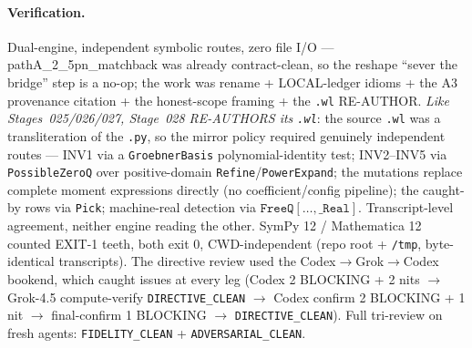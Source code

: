 \paragraph{Verification.}
Dual-engine, independent symbolic routes, zero file I/O --- pathA\_2\_5pn\_matchback was already contract-clean, so the
reshape ``sever the bridge'' step is a no-op; the work was rename + LOCAL-ledger idioms + the A3 provenance citation + the
honest-scope framing + the \texttt{.wl} RE-AUTHOR. \emph{Like Stages~025/026/027, Stage~028 RE-AUTHORS its \texttt{.wl}}: the
source \texttt{.wl} was a transliteration of the \texttt{.py}, so the mirror policy required genuinely independent routes ---
INV1 via a \texttt{GroebnerBasis} polynomial-identity test; INV2--INV5 via \texttt{PossibleZeroQ} over positive-domain
\texttt{Refine}/\texttt{PowerExpand}; the mutations replace complete moment expressions directly (no coefficient/config
pipeline); the caught-by rows via \texttt{Pick}; machine-real detection via \(\texttt{FreeQ}[\ldots,\texttt{\_Real}]\).
Transcript-level agreement, neither engine reading the other. SymPy 12 / Mathematica 12 counted EXIT-1 teeth, both exit 0,
CWD-independent (repo root + \texttt{/tmp}, byte-identical transcripts). The directive review used the
Codex\(\to\)Grok\(\to\)Codex bookend, which caught issues at every leg (Codex 2 BLOCKING + 2 nits \(\to\) Grok-4.5
compute-verify \texttt{DIRECTIVE\_CLEAN} \(\to\) Codex confirm 2 BLOCKING + 1 nit \(\to\) final-confirm 1 BLOCKING \(\to\)
\texttt{DIRECTIVE\_CLEAN}). Full tri-review on fresh agents: \texttt{FIDELITY\_CLEAN} + \texttt{ADVERSARIAL\_CLEAN}.
